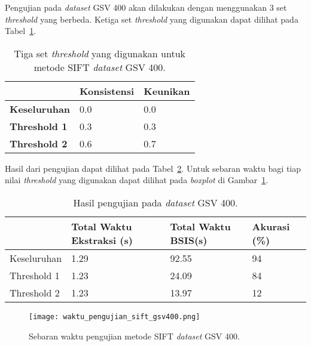 Pengujian pada \textit{dataset} GSV 400 akan dilakukan dengan menggunakan 3 set \textit{threshold} yang berbeda. Ketiga set \textit{threshold} yang digunakan dapat dilihat pada Tabel~\ref{tab:threshold_gsv400_sift}.
\begin{table}[H]
	\centering
	\begin{tabular}{|l|l|l|}
		\hline
		& \textbf{Konsistensi} & \textbf{Keunikan} \\ \hline
		\textbf{Keseluruhan} & 0.0                  & 0.0               \\ \hline
		\textbf{Threshold 1} & 0.3                  & 0.3               \\ \hline
		\textbf{Threshold 2} & 0.6                  & 0.7               \\ \hline
	\end{tabular}
	\caption{Tiga set \textit{threshold} yang digunakan untuk metode SIFT \textit{dataset} GSV 400.}
	\label{tab:threshold_gsv400_sift}
\end{table}
Hasil dari pengujian dapat dilihat pada Tabel~\ref{tab:pengujian_sift_gsv400}. Untuk sebaran waktu bagi tiap nilai \textit{threshold} yang digunakan dapat dilihat pada \textit{boxplot} di Gambar~\ref{fig:waktu_pengujian_sift_gsv400}.
\begin{table}[H]
	\centering
	\begin{tabular}{|l|l|l|l|}
		\hline
		& \textbf{Total Waktu Ekstraksi (s)} & \textbf{Total Waktu BSIS(s)} & \textbf{Akurasi (\%)} \\ \hline
		Keseluruhan & 1.29	&	92.55                    & 94                    \\ \hline
		Threshold 1 & 1.23	&	24.09                    & 84                    \\ \hline
		Threshold 2 & 1.23	&	13.97                    & 12                    \\ \hline
	\end{tabular}
	\caption{Hasil pengujian pada \textit{dataset} GSV 400.}
	\label{tab:pengujian_sift_gsv400}
\end{table}
\begin{figure}[H]
	\centering
	\texttt{[image: waktu\_pengujian\_sift\_gsv400.png]}
	\caption{Sebaran waktu pengujian metode SIFT \textit{dataset} GSV 400.}
	\label{fig:waktu_pengujian_sift_gsv400}
\end{figure}

